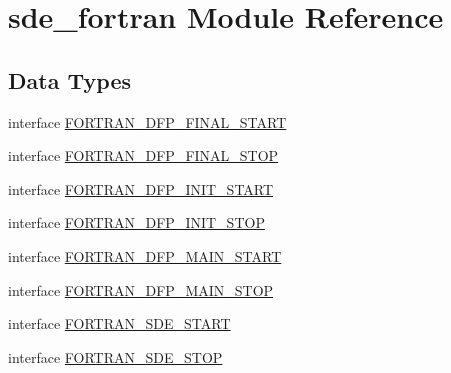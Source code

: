 \hypertarget{namespacesde__fortran}{}\section{sde\+\_\+fortran Module Reference}
\label{namespacesde__fortran}
\subsection*{Data Types}
\begin{DoxyCompactItemize}
\item 
interface \hyperlink{interfacesde__fortran_1_1_f_o_r_t_r_a_n___d_f_p___f_i_n_a_l___s_t_a_r_t}{F\+O\+R\+T\+R\+A\+N\+\_\+\+D\+F\+P\+\_\+\+F\+I\+N\+A\+L\+\_\+\+S\+T\+A\+RT}
\item 
interface \hyperlink{interfacesde__fortran_1_1_f_o_r_t_r_a_n___d_f_p___f_i_n_a_l___s_t_o_p}{F\+O\+R\+T\+R\+A\+N\+\_\+\+D\+F\+P\+\_\+\+F\+I\+N\+A\+L\+\_\+\+S\+T\+OP}
\item 
interface \hyperlink{interfacesde__fortran_1_1_f_o_r_t_r_a_n___d_f_p___i_n_i_t___s_t_a_r_t}{F\+O\+R\+T\+R\+A\+N\+\_\+\+D\+F\+P\+\_\+\+I\+N\+I\+T\+\_\+\+S\+T\+A\+RT}
\item 
interface \hyperlink{interfacesde__fortran_1_1_f_o_r_t_r_a_n___d_f_p___i_n_i_t___s_t_o_p}{F\+O\+R\+T\+R\+A\+N\+\_\+\+D\+F\+P\+\_\+\+I\+N\+I\+T\+\_\+\+S\+T\+OP}
\item 
interface \hyperlink{interfacesde__fortran_1_1_f_o_r_t_r_a_n___d_f_p___m_a_i_n___s_t_a_r_t}{F\+O\+R\+T\+R\+A\+N\+\_\+\+D\+F\+P\+\_\+\+M\+A\+I\+N\+\_\+\+S\+T\+A\+RT}
\item 
interface \hyperlink{interfacesde__fortran_1_1_f_o_r_t_r_a_n___d_f_p___m_a_i_n___s_t_o_p}{F\+O\+R\+T\+R\+A\+N\+\_\+\+D\+F\+P\+\_\+\+M\+A\+I\+N\+\_\+\+S\+T\+OP}
\item 
interface \hyperlink{interfacesde__fortran_1_1_f_o_r_t_r_a_n___s_d_e___s_t_a_r_t}{F\+O\+R\+T\+R\+A\+N\+\_\+\+S\+D\+E\+\_\+\+S\+T\+A\+RT}
\item 
interface \hyperlink{interfacesde__fortran_1_1_f_o_r_t_r_a_n___s_d_e___s_t_o_p}{F\+O\+R\+T\+R\+A\+N\+\_\+\+S\+D\+E\+\_\+\+S\+T\+OP}
\end{DoxyCompactItemize}
